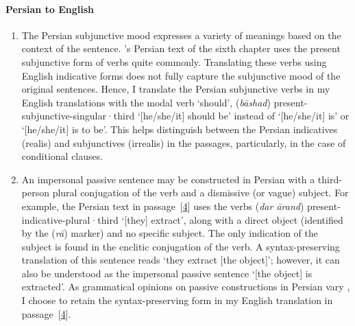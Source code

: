 \paragraph{Persian to English} 
\begin{enumerate}[topsep=0pt]
    \item The Persian subjunctive mood expresses a variety of meanings based on the context of the sentence. \MullaFarid's Persian text of the sixth chapter uses the present subjunctive form of verbs quite commonly. Translating these verbs using English indicative forms does not fully capture the subjunctive mood of the original sentences. Hence, I translate the Persian subjunctive verbs in my English translations with the modal verb `should', \eg {} (\textit{bāshad})  \acrshort{present}-\acrshort{subjunctive}-\acrshort{singular}·\acrshort{third} `[he/she/it] should be' instead of `[he/she/it] is' or `[he/she/it] is to be'. This helps distinguish between the Persian indicatives (realis) and subjunctives (irrealis) in the passages, particularly, in the case of conditional clauses.
                
    \item An impersonal passive sentence may be constructed in Persian with a third-person plural conjugation of the verb and a dismissive (or vague) subject. For example, the Persian text in passage~[\hyperlink{Ppass4}{4}] uses the verbs  (\textit{dar ārand}) \acrshort{present}-\acrshort{indicative}-\acrshort{plural}·\acrshort{third} `[they] extract', along with a direct object (identified by the  (\textit{rā}) marker) and no specific subject. The only indication of the subject is found in the enclitic conjugation of the verb. A syntax-preserving translation of this sentence reads `they extract [the object]'; however, it can also be understood as the impersonal passive sentence `[the object] is extracted'. As grammatical opinions on passive constructions in Persian vary  \parencite[\eg \vid][261--264]{NematiPersianpassive}, I choose to retain the syntax-preserving form in my English translation in passage~[\hyperlink{PEpass4}{4}].
\end{enumerate}

